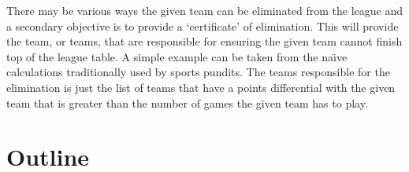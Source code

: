 There may be various ways the given team can be eliminated from the league
and a secondary objective is to provide a `certificate' of elimination. This
will provide the team, or teams, that are responsible for ensuring the given
team cannot finish top of the league table. A simple example can be taken
from the na\"{\i}ve calculations traditionally used by sports pundits. The
teams responsible for the elimination is just the list of teams that have a
points differential with the given team that is greater than the number of 
games the given team has to play.

\section{Outline}